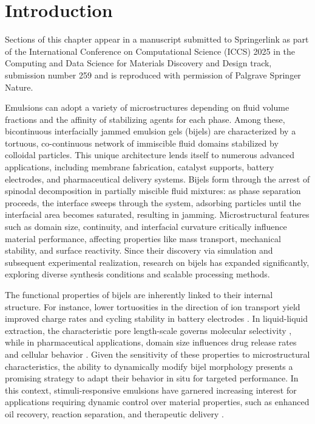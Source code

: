\section{Introduction}

Sections of this chapter appear in a manuscript submitted to Springerlink as part of the International Conference on Computational 
Science (ICCS) 2025 in the Computing and Data Science for Materials Discovery and Design track, submission number 259 and is
reproduced with permission of Palgrave Springer Nature. 

Emulsions can adopt a variety of microstructures depending on fluid volume fractions and the affinity of stabilizing agents for each phase. Among these, bicontinuous 
interfacially jammed emulsion gels (bijels) are characterized by a tortuous, co-continuous network of immiscible fluid domains stabilized by colloidal particles. This 
unique architecture lends itself to numerous advanced applications, including membrane fabrication, catalyst supports, battery electrodes, and pharmaceutical delivery 
systems. Bijels form through the arrest of spinodal decomposition in partially miscible fluid mixtures: as phase separation proceeds, the interface sweeps through the 
system, adsorbing particles until the interfacial area becomes saturated, resulting in jamming. Microstructural features such as domain size, continuity, and interfacial 
curvature critically influence material performance, affecting properties like mass transport, mechanical stability, and surface reactivity. Since their discovery via 
simulation and subsequent experimental realization, research on bijels has expanded significantly, exploring diverse synthesis conditions and scalable processing methods.

The functional properties of bijels are inherently linked to their internal structure. For instance, lower tortuosities in the direction of ion transport yield improved charge 
rates and cycling stability in battery electrodes \cite{ebner_tortuosity_2014, samdani_bicontinuous_2017}. In liquid-liquid extraction, the characteristic pore length-scale governs 
molecular selectivity \cite{khan_nanostructured_2022}, while in pharmaceutical applications, domain size influences drug release rates and cellular behavior 
\cite{vanoli_bijels_2022, thorson_bijel-templated_2019}. Given the sensitivity of these properties to microstructural characteristics, the ability to dynamically modify bijel 
morphology presents a promising strategy to adapt their behavior in situ for targeted performance. In this context, stimuli-responsive emulsions have garnered increasing interest 
for applications requiring dynamic control over material properties, such as enhanced oil recovery, reaction separation, and therapeutic delivery 
\cite{tham_magnetophoresis_2021, cui_stabilizing_2013, rozynek_opening_2019, lu_controllable_2020}. 

